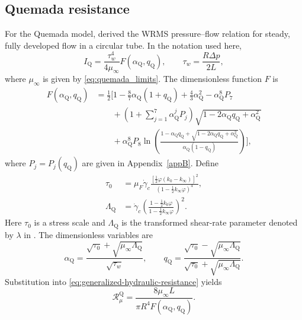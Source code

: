 \documentclass[lineno]{jfm}
\begin{document}
\subsection{Quemada resistance}
For the Quemada model, \citet{Popel1993} derived the WRMS pressure--flow
relation for steady, fully developed flow in a circular tube. In the notation
used here,
\begin{equation}
I_{\mathrm Q}
=
\frac{\tau_w^4}{4\mu_\infty}
F(\alpha_{\mathrm Q},q_{\mathrm Q}),
\qquad
\tau_w
=
\frac{R\Delta p}{2L},
\label{eq:I_Q}
\end{equation}
where $\mu_\infty$ is given by \eqref{eq:quemada_limits}. The dimensionless
function $F$ is
\begin{align}
F(\alpha_{\mathrm Q},q_{\mathrm Q})
&=
\frac{1}{2}
\Bigg[
1
-\frac{8}{7}\alpha_{\mathrm Q}(1+q_{\mathrm Q})
+\frac{4}{3}\alpha_{\mathrm Q}^2
-\alpha_{\mathrm Q}^8P_7
\nonumber\\
&\qquad
+
\left(
1+\sum_{j=1}^{7}
\alpha_{\mathrm Q}^{j}P_j
\right)
\sqrt{
1-2\alpha_{\mathrm Q}q_{\mathrm Q}
+\alpha_{\mathrm Q}^2
}
\nonumber\\
&\qquad
+
\alpha_{\mathrm Q}^8P_8
\ln\left(
\frac{
1-\alpha_{\mathrm Q}q_{\mathrm Q}
+
\sqrt{
1-2\alpha_{\mathrm Q}q_{\mathrm Q}
+\alpha_{\mathrm Q}^2
}
}{
\alpha_{\mathrm Q}(1-q_{\mathrm Q})
}
\right)
\Bigg],
\label{eq:F_alpha_q}
\end{align}
where $P_j=P_j(q_{\mathrm Q})$ are given in Appendix~\ref{appB}.
Define
\begin{align}
\tau_0
&=
\mu_F\dot{\gamma}_c
\frac{
\left[
\tfrac12\varphi(k_0-k_\infty)
\right]^2
}{
\left(
1-\tfrac12k_\infty\varphi
\right)^4
},
\label{eq:tau0_quemada}\\
\Lambda_{\mathrm Q}
&=
\dot{\gamma}_c
\left(
\frac{
1-\tfrac12k_0\varphi
}{
1-\tfrac12k_\infty\varphi
}
\right)^2 .
\label{eq:lambdaQ}
\end{align}
Here $\tau_0$ is a stress scale and
$\Lambda_{\mathrm Q}$ is the transformed shear-rate parameter denoted by
$\lambda$ in \citet{Popel1993}. The dimensionless variables are
\begin{equation}
\alpha_{\mathrm Q}
=
\frac{
\sqrt{\tau_0}
+
\sqrt{\mu_\infty\Lambda_{\mathrm Q}}
}{
\sqrt{\tau_w}
},
\qquad
q_{\mathrm Q}
=
\frac{
\sqrt{\tau_0}
-
\sqrt{\mu_\infty\Lambda_{\mathrm Q}}
}{
\sqrt{\tau_0}
+
\sqrt{\mu_\infty\Lambda_{\mathrm Q}}
}.
\label{eq:alpha_q}
\end{equation}
Substitution into
\eqref{eq:generalized-hydraulic-resistance} yields
\begin{equation}
\mathcal{R}_{\mu}^{\mathrm Q}
=
\frac{
8\mu_\infty L
}{
\pi R^4
F(\alpha_{\mathrm Q},q_{\mathrm Q})
}.
\label{eq:R_Q}
\end{equation}
\end{document}
